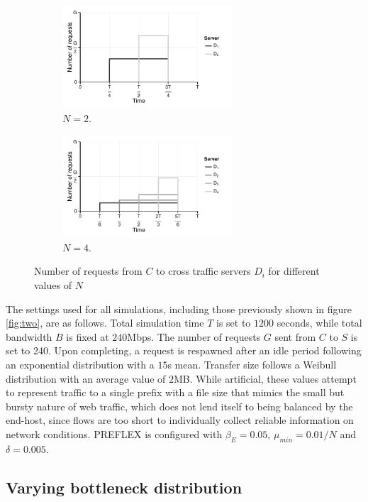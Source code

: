 \begin{figure}
    \begin{subfigure}[b]{.5\linewidth}
        \centering
        \includegraphics[width=2.5in]{figures/cate/dummy2}
        \caption{$N=2$.}\label{fig:1a}
    \end{subfigure}%
    \begin{subfigure}[b]{.5\linewidth}
        \centering
        \includegraphics[width=2.5in]{figures/cate/dummy4}
        \caption{$N=4$.}\label{fig:1b}
    \end{subfigure}
    \caption[Number of requests to cross traffic servers.]{Number of requests from $C$ to cross traffic servers $D_i$ for different values of $N$}
    \label{fig:demand}
\end{figure}

The settings used for all simulations, including those previously shown in figure \ref{fig:two}, are as follows.
Total simulation time $T$ is set to $1200$ seconds, while total bandwidth $B$ is fixed at $240$Mbps. 
The number of requests $G$ sent from $C$ to $S$ is set to 240. 
Upon completing, a request is respawned after an idle period following an exponential distribution with a $15$s mean. 
Transfer size follows a Weibull distribution with an average value of $2$MB. 
While artificial, these values attempt to represent traffic to a single prefix with a file size that mimics the small but bursty nature of web traffic, which does not lend itself to being balanced by the end-host, since flows are too short to individually collect reliable information on network conditions.
\ac{PREFLEX} is configured with $\beta_E = 0.05$, $\mu_{min}=0.01/N$ and $\delta=0.005$.

\subsection{Varying bottleneck distribution}

